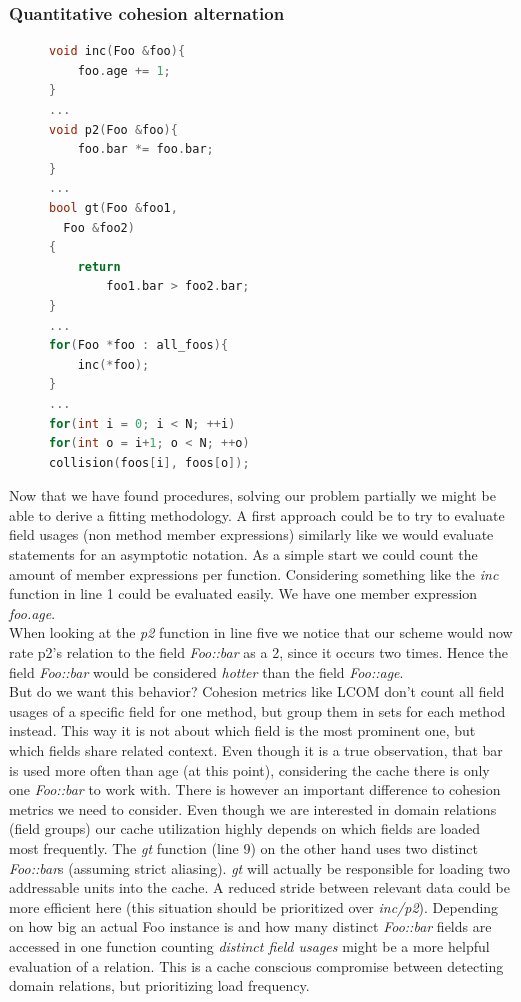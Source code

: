 \subsubsection{Quantitative cohesion alternation}
\begin{figure}
\begin{lstlisting}[language=C++, name={Exemplary pseudo-ish code}, label={exem_code}]
void inc(Foo &foo){
	foo.age += 1;
}
...
void p2(Foo &foo){
	foo.bar *= foo.bar;
}
...
bool gt(Foo &foo1,
  Foo &foo2)
{
	return
		foo1.bar > foo2.bar;
}
...
for(Foo *foo : all_foos){
	inc(*foo);
}
...
for(int i = 0; i < N; ++i)
for(int o = i+1; o < N; ++o)
collision(foos[i], foos[o]);
\end{lstlisting}
\end{figure}
Now that we have found procedures, solving our problem partially we might be able to derive a fitting methodology. A first approach could be to try to evaluate field usages (non method member expressions) similarly like we would evaluate statements for an asymptotic notation. As a simple start we could count the amount of member expressions per function. Considering something like  the \textit{inc} function in line 1 could be evaluated easily. We have one member expression \textit{foo.age}.\\
When looking at the \textit{p2} function in line five we notice that our scheme would now rate p2's relation to the field \textit{Foo::bar} as a 2, since it occurs two times. Hence the field \textit{Foo::bar} would be considered \textit{hotter} than the field \textit{Foo::age}.\\
But do we want this behavior? Cohesion metrics like LCOM don't count all field usages of a specific field for one method, but group them in sets for each method instead. This way it is not about which field is the most prominent one, but which fields share related context. Even though it is a true observation, that bar is used more often than age (at this point), considering the cache there is only one \textit{Foo::bar} to work with. There is however an important difference to cohesion metrics we need to consider. Even though we are interested in domain relations (field groups) our cache utilization highly depends on which fields are loaded most frequently. The \textit{gt} function (line 9) on the other hand uses two distinct \textit{Foo::bar}s (assuming strict aliasing). \textit{gt} will actually be responsible for loading two addressable units into the cache. A reduced stride between relevant data could be more efficient here (this situation should be prioritized over \textit{inc/p2}). Depending on how big an actual Foo instance is and how many distinct \textit{Foo::bar} fields are accessed in one function counting \textit{distinct field usages} might be a more helpful evaluation of a relation. This is a cache conscious compromise between detecting domain relations, but prioritizing load frequency.\\\\
